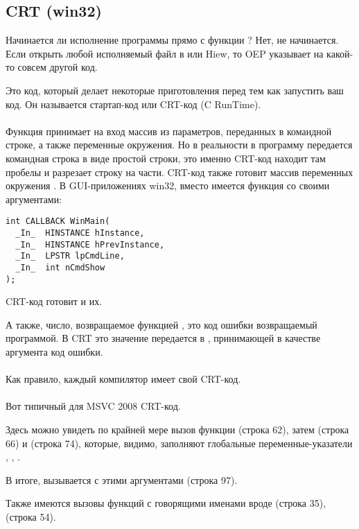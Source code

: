 \subsection{CRT (win32)}
\label{sec:CRT}

Начинается ли исполнение программы прямо с функции \main{}?
Нет, не начинается.
Если открыть любой исполняемый файл в \IDA или Hiew, 
то \ac{OEP} указывает на какой-то совсем другой код.

Это код, который делает некоторые приготовления перед тем как запустить ваш код.
Он называется стартап-код или CRT-код (C RunTime). \\
\\
Функция \main{} принимает на вход массив из параметров, переданных в командной строке, а также
переменные окружения.
Но в реальности в программу передается командная строка в виде простой строки, это именно
CRT-код находит там пробелы и разрезает строку на части.
CRT-код также готовит массив переменных окружения .
В \ac{GUI}-приложениях win32, вместо \main{} имеется функция  со своими аргументами:

\begin{lstlisting}[style=customc]
int CALLBACK WinMain(
  _In_  HINSTANCE hInstance,
  _In_  HINSTANCE hPrevInstance,
  _In_  LPSTR lpCmdLine,
  _In_  int nCmdShow
);
\end{lstlisting}

CRT-код готовит и их.

А также, число, возвращаемое функцией \main{}, это код ошибки возвращаемый программой.
В CRT это значение передается в , принимающей в качестве аргумента код ошибки. \\
\\
Как правило, каждый компилятор имеет свой CRT-код. \\
\\
Вот типичный для MSVC 2008 CRT-код.



Здесь можно увидеть по крайней мере вызов
функции  (строка 62), 
затем  (строка 66) и  (строка 74),
которые, видимо, заполняют глобальные переменные-указатели
, , .

В итоге, вызывается \main{} с этими аргументами (строка 97).

Также имеются вызовы функций с говорящими именами вроде  (строка 35),  (строка 54).

